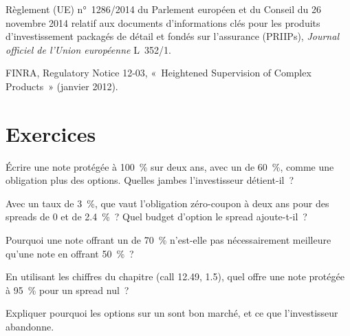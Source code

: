 \begin{omsources}
\item Règlement (UE) n°~1286/2014 du Parlement européen et du Conseil du 26 novembre 2014 relatif aux documents d'informations clés pour
les produits d'investissement packagés de détail et fondés sur l'assurance (PRIIPs), \emph{Journal officiel de l'Union européenne} L~352/1.
\item FINRA, Regulatory Notice 12-03, «~Heightened Supervision of Complex Products~» (janvier 2012).
\end{omsources}

\section{Exercices}

\begin{exercise}[$\star$]\label{exo:dv:the-structured-products-business:1}
Écrire une note protégée à 100~\% sur deux ans, avec un  de 60~\%, comme une obligation plus des options. Quelles jambes l'investisseur détient-il~?
\end{exercise}

\begin{exercise}[$\star$]\label{exo:dv:the-structured-products-business:2}
Avec un taux de 3~\%, que vaut l'obligation zéro-coupon à deux ans pour des spreads de 0 et de 2.4~\%~? Quel budget d'option le spread ajoute-t-il~?
\end{exercise}

\begin{exercise}[$\star$]\label{exo:dv:the-structured-products-business:3}
Pourquoi une note offrant un  de 70~\% n'est-elle pas nécessairement meilleure qu'une note en offrant 50~\%~?
\end{exercise}

\begin{exercise}[$\star\star$]\label{exo:dv:the-structured-products-business:4}
En utilisant les chiffres du chapitre (call 12.49,  1.5), quel  offre une note protégée à 95~\% pour un spread nul~?
\end{exercise}

\begin{exercise}[$\star\star$]\label{exo:dv:the-structured-products-business:5}
Expliquer pourquoi les options sur un  sont bon marché, et ce que l'investisseur abandonne.
\end{exercise}

